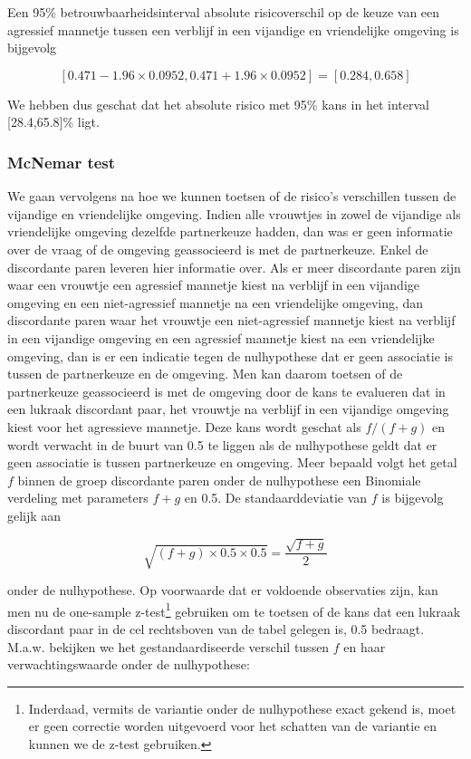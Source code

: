 \documentclass[
  12pt,dutch,coursenotes]{book}
\begin{document}
Een 95\% betrouwbaarheidsinterval absolute risicoverschil op de keuze van een agressief mannetje tussen een verblijf in een vijandige en vriendelijke omgeving is bijgevolg

\begin{equation*}
\left[0.471-1.96\times 0.0952,0.471+1.96\times 0.0952\right]=[0.284,0.658]
\end{equation*}

We hebben dus geschat dat het absolute risico met 95\% kans in het interval {[}28.4,65.8{]}\% ligt.

\hypertarget{mcnemar-test}{%
\subsubsection{McNemar test}\label{mcnemar-test}}

We gaan vervolgens na hoe we kunnen toetsen of de risico's verschillen tussen de vijandige en vriendelijke omgeving.
Indien alle vrouwtjes in zowel de vijandige als vriendelijke omgeving dezelfde partnerkeuze hadden, dan was er geen informatie over de vraag of de omgeving geassocieerd is met de partnerkeuze. Enkel de discordante paren leveren hier informatie over. Als
er meer discordante paren zijn waar een vrouwtje een agressief mannetje kiest na verblijf in een vijandige omgeving en een niet-agressief mannetje na een vriendelijke omgeving, dan discordante paren waar het vrouwtje een niet-agressief mannetje kiest na verblijf in een vijandige omgeving en een agressief mannetje kiest na een vriendelijke omgeving, dan is er een
indicatie tegen de nulhypothese dat er geen associatie is tussen de partnerkeuze en de omgeving.
Men kan daarom toetsen of de partnerkeuze geassocieerd is met de omgeving door de kans te evalueren dat in een
lukraak discordant paar, het vrouwtje na verblijf in een vijandige omgeving kiest voor het agressieve mannetje.
Deze kans wordt geschat als \(f/(f+g)\) en wordt verwacht in de buurt
van 0.5 te liggen als de nulhypothese geldt dat er geen associatie is tussen partnerkeuze en omgeving.
Meer bepaald volgt het getal \(f\) binnen de
groep discordante paren onder de nulhypothese een Binomiale verdeling met
parameters \(f+g\) en 0.5. De standaarddeviatie van \(f\) is bijgevolg gelijk
aan

\begin{equation*}
\sqrt{(f+g)\times 0.5\times 0.5}=\frac{\sqrt{f+g}}{2}
\end{equation*}

onder de nulhypothese. Op voorwaarde dat er voldoende observaties zijn, kan men nu de one-sample z-test\footnote{Inderdaad, vermits de variantie onder de nulhypothese exact gekend is, moet er geen correctie worden uitgevoerd voor het schatten van de variantie en kunnen we de z-test gebruiken.}
gebruiken om te toetsen of de kans dat een lukraak discordant paar in de cel rechtsboven van de tabel
gelegen is, 0.5 bedraagt. M.a.w. bekijken we het gestandaardiseerde verschil
tussen \(f\) en haar verwachtingswaarde onder de nulhypothese:
\end{document}

